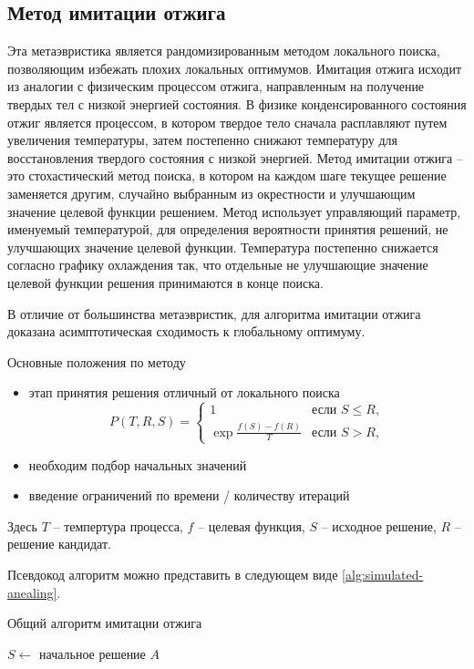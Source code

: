 \subsection{Метод имитации отжига}
Эта метаэвристика является рандомизированным методом локального поиска, позволяющим избежать плохих локальных 
оптимумов. Имитация отжига исходит из аналогии с физическим процессом отжига, направленным на получение 
твердых тел с низкой энергией состояния. В физике конденсированного состояния отжиг является процессом, в 
котором твердое тело сначала расплавляют путем увеличения температуры, затем постепенно снижают температуру
для восстановления твердого состояния с низкой энергией. Метод имитации отжига -- это стохастический метод 
поиска, в котором на каждом шаге текущее решение заменяется другим, случайно выбранным из окрестности и 
улучшающим значение целевой функции решением. Метод использует управляющий параметр, именуемый температурой, 
для определения вероятности принятия решений, не улучшающих значение целевой функции. Температура постепенно 
снижается согласно графику охлаждения так, что отдельные не улучшающие значение целевой функции решения 
принимаются в конце поиска.

В отличие от большинства метаэвристик, для алгоритма имитации отжига доказана асимптотическая сходимость к 
глобальному оптимуму. 

Основные положения по методу
\begin{itemize}
    \item этап принятия решения отличный от локального поиска
    \[
        P(T, R, S)= \left\{\begin{array}{cc}
            1                       & \text{если } S \leq R, \\
            \exp\frac{f(S)-f(R)}{T} & \text{если } S > R,
        \end{array}\right.
    \]
    \item необходим подбор начальных значений
    \item введение ограничений по времени / количеству итераций
\end{itemize}

Здесь \( T \) -- темпертура процесса, \( f \) -- целевая функция, \( S \) -- исходное решение, 
\( R \) -- решение кандидат.

Псевдокод алгоритм можно представить в следующем виде \ref{alg:simulated-anealing}.
\begin{algorithm}[ht!]
    \caption{Общий алгоритм имитации отжига}
    \( S \leftarrow \) начальное решение \( A \)\;
    \label{alg:simulated-anealing}
\end{algorithm}

